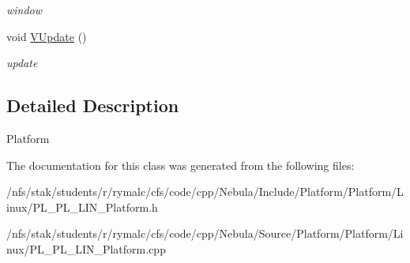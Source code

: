 \begin{DoxyCompactItemize}
\begin{DoxyCompactList}\small\item\em window \item\end{DoxyCompactList}\item 
\hypertarget{classPlatform_1_1Platform_1_1Linux_1_1Platform_ac29235eaf374033b7e41694fd42d8f62}{
void \hyperlink{classPlatform_1_1Platform_1_1Linux_1_1Platform_ac29235eaf374033b7e41694fd42d8f62}{VUpdate} ()}
\label{classPlatform_1_1Platform_1_1Linux_1_1Platform_ac29235eaf374033b7e41694fd42d8f62}

\begin{DoxyCompactList}\small\item\em update \item\end{DoxyCompactList}\end{DoxyCompactItemize}


\subsection{Detailed Description}
Platform 

The documentation for this class was generated from the following files:\begin{DoxyCompactItemize}
\item 
/nfs/stak/students/r/rymalc/cfs/code/cpp/Nebula/Include/Platform/Platform/Linux/PL\_\-PL\_\-LIN\_\-Platform.h\item 
/nfs/stak/students/r/rymalc/cfs/code/cpp/Nebula/Source/Platform/Platform/Linux/PL\_\-PL\_\-LIN\_\-Platform.cpp\end{DoxyCompactItemize}
